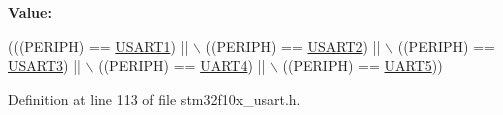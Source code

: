 {\bfseries Value\+:}
\begin{DoxyCode}
(((PERIPH) == \hyperlink{group___peripheral__declaration_ga92871691058ff7ccffd7635930cb08da}{USART1}) || \(\backslash\)
                                     ((PERIPH) == \hyperlink{group___peripheral__declaration_gaf114a9eab03ca08a6fb720e511595930}{USART2}) || \(\backslash\)
                                     ((PERIPH) == \hyperlink{group___peripheral__declaration_ga2350115553c1fe0a7bc14e6a7ec6a225}{USART3}) || \(\backslash\)
                                     ((PERIPH) == \hyperlink{group___peripheral__declaration_ga7c035f6f443c999fc043b2b7fb598800}{UART4}) || \(\backslash\)
                                     ((PERIPH) == \hyperlink{group___peripheral__declaration_ga9274e37cf5e8a174fc5dd627b98ec0fe}{UART5}))
\end{DoxyCode}


Definition at line 113 of file stm32f10x\+\_\+usart.\+h.

